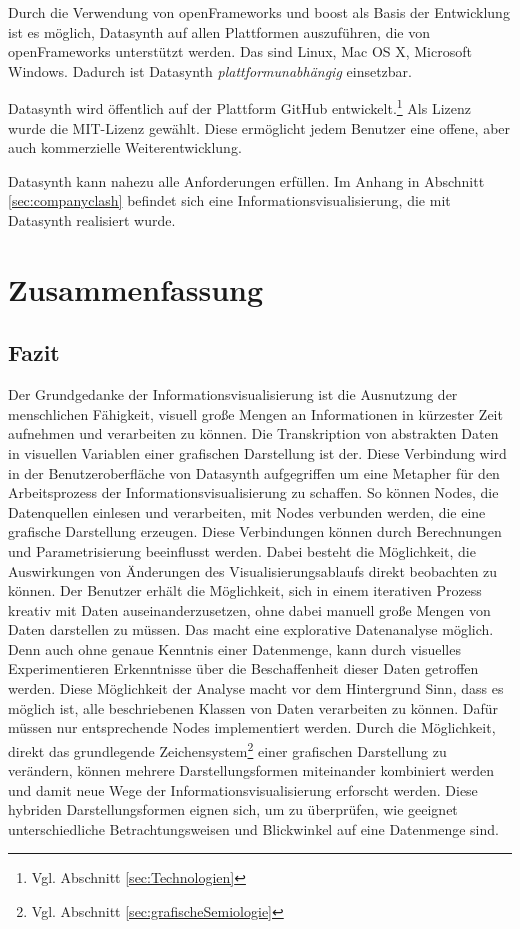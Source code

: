 \documentclass[a4paper, 
               12pt,
               DIV=calc,
               version=first,
               pdftex,
               headsepline,
               footsepline,
               bibtotocnumbered,
               liststotocnumbered]{scrreprt}
\begin{document}
Durch die Verwendung von openFrameworks und boost als Basis der Entwicklung
ist es möglich, Datasynth auf allen Plattformen auszuführen, die von openFrameworks
unterstützt werden. Das sind Linux, Mac OS X, Microsoft Windows.
Dadurch ist Datasynth \textit{plattformunabhängig} einsetzbar.

Datasynth wird öffentlich auf der Plattform GitHub entwickelt.\footnote{Vgl.
Abschnitt \ref{sec:Technologien}} Als Lizenz wurde die MIT-Lizenz gewählt.
Diese ermöglicht jedem Benutzer eine offene, aber auch kommerzielle Weiterentwicklung.

Datasynth kann nahezu alle Anforderungen erfüllen. Im Anhang in Abschnitt
\ref{sec:companyclash} befindet sich eine Informationsvisualisierung, die mit
Datasynth realisiert wurde.

\chapter{Zusammenfassung}
\label{cha:Zusammenfassung}
\section{Fazit}
\label{sec:Fazit}
Der Grundgedanke der Informationsvisualisierung ist die Ausnutzung
der menschlichen Fähigkeit, visuell große Mengen an Informationen in kürzester Zeit
aufnehmen und verarbeiten zu können.
Die Transkription von abstrakten Daten in visuellen Variablen einer
grafischen Darstellung ist der. Diese Verbindung wird in der Benutzeroberfläche
von Datasynth aufgegriffen um eine Metapher für den Arbeitsprozess der Informationsvisualisierung
zu schaffen. So können Nodes, die Datenquellen einlesen und verarbeiten, mit Nodes verbunden werden, die eine grafische
Darstellung erzeugen. Diese Verbindungen können durch Berechnungen und Parametrisierung beeinflusst werden.
Dabei besteht die Möglichkeit, die Auswirkungen von Änderungen des Visualisierungsablaufs direkt beobachten zu können.
Der Benutzer erhält die Möglichkeit, sich in einem iterativen
Prozess kreativ mit Daten auseinanderzusetzen, ohne dabei manuell
große Mengen von Daten darstellen zu müssen.
Das macht eine explorative Datenanalyse möglich.
Denn auch ohne genaue Kenntnis einer Datenmenge, kann durch visuelles Experimentieren
Erkenntnisse über die Beschaffenheit dieser Daten getroffen werden.
Diese Möglichkeit der Analyse macht vor dem Hintergrund Sinn, dass es
möglich ist, alle beschriebenen Klassen von Daten verarbeiten zu können. Dafür müssen
nur entsprechende Nodes implementiert werden.
Durch die Möglichkeit, direkt das grundlegende Zeichensystem\footnote{Vgl. Abschnitt \ref{sec:grafischeSemiologie}} einer
grafischen Darstellung zu verändern, können mehrere Darstellungsformen
miteinander kombiniert werden und damit neue Wege der Informationsvisualisierung erforscht werden.
Diese hybriden Darstellungsformen eignen sich,
um zu überprüfen, wie geeignet unterschiedliche Betrachtungsweisen und Blickwinkel auf eine Datenmenge sind.
\end{document}
